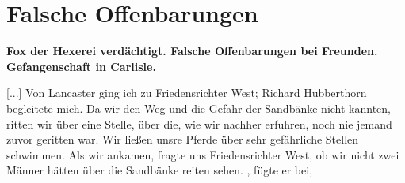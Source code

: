 
\chapter[Falsche Offenbarungen]{Falsche Offenbarungen}

\begin{center}
\textbf{Fox der Hexerei verdächtigt. Falsche Offenbarungen 
bei Freunden. Gefangenschaft in Carlisle.}
\end{center}

[...] Von Lancaster ging ich zu Friedensrichter 
West; Richard
Hubberthorn begleitete mich. 
Da wir den Weg und die Gefahr
der Sandbänke nicht kannten, ritten wir über eine Stelle, über
die, wie wir nachher erfuhren, noch nie jemand zuvor geritten
war. Wir ließen unsre Pferde über sehr gefährliche Stellen
schwimmen. Als wir ankamen, fragte uns Friedensrichter West,
ob wir nicht zwei Männer hätten über die Sandbänke reiten
sehen. , fügte er bei, 





